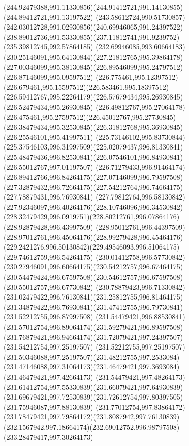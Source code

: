 {{		\curveto(244.92479388,991.11330856)(244.91412721,991.14130855)(244.89412721,991.13197522)
		\curveto(243.58612724,990.51730857)(242.03012728,991.02930856)(240.69946065,991.24397522)
		\curveto(238.89012736,991.53330855)(237.11812741,991.9239752)(235.39812745,992.57864185)
		\curveto(232.69946085,993.60664183)(230.25146091,995.64130844)(227.21812765,995.39864178)
		\curveto(227.00346099,995.38130845)(226.89546099,995.24797512)(226.87146099,995.09597512)
		\curveto(226.775461,995.12397512)(226.679461,995.15597512)(226.583461,995.18397512)
		\curveto(226.59412767,995.22264179)(226.57679434,995.26930845)(226.52479434,995.26930845)
		\curveto(226.49812767,995.27064178)(226.475461,995.27597512)(226.45012767,995.27730845)
		\curveto(226.38479434,995.32530845)(226.31812768,995.36930845)(226.25546101,995.41997511)
		\curveto(225.73146102,995.83730844)(225.37546103,996.31997509)(225.02079437,996.81330841)
		\curveto(225.48479436,996.82530841)(226.07546101,996.84930841)(226.55012767,997.01197507)
		\curveto(226.71279433,996.91464174)(226.89412766,996.84264175)(227.07146099,996.79597508)
		\curveto(227.32879432,996.72664175)(227.54212764,996.74664175)(227.78879431,996.76930841)
		\curveto(227.79812764,996.58130842)(227.92346097,996.40264176)(228.10746096,996.34530842)
		\curveto(228.32479429,996.0919751)(228.80212761,996.07864176)(228.92879428,996.43997509)
		\curveto(228.95012761,996.44397509)(228.97012761,996.45064176)(228.99279428,996.45464176)
		\curveto(229.2421276,996.50130842)(229.49546093,996.51064175)(229.74612759,996.54264175)
		\curveto(230.01412758,996.57730842)(230.27946091,996.60664175)(230.54212757,996.67464175)
		\curveto(230.54479424,996.67597508)(230.54612757,996.67597508)(230.55012757,996.67730842)
		\curveto(230.78879423,996.71330842)(231.02479422,996.76130841)(231.25812755,996.81464175)
		\curveto(231.34879422,996.76930841)(231.47412755,996.79730841)(231.52212755,996.87997508)
		\curveto(231.54479421,996.88530841)(231.57012754,996.89064174)(231.59279421,996.89597508)
		\curveto(231.76879421,996.94664174)(231.72079421,997.24397507)(231.54212754,997.25197507)
		\curveto(231.52212755,997.25197507)(231.50346088,997.25197507)(231.48212755,997.2533084)
		\curveto(231.47146088,997.31064173)(231.46479421,997.3693084)(231.46479421,997.42664173)
		\curveto(231.54479421,997.48264173)(231.61412754,997.55330839)(231.66079421,997.64930839)
		\curveto(231.69679421,997.72530839)(231.72612754,997.80397505)(231.75946087,997.88130839)
		\curveto(231.77012754,997.83864172)(231.78479421,997.79864172)(231.8087942,997.76130839)
		\curveto(232.1567942,997.18664174)(232.69012752,996.98797508)(233.28479417,997.30264173)
}}
